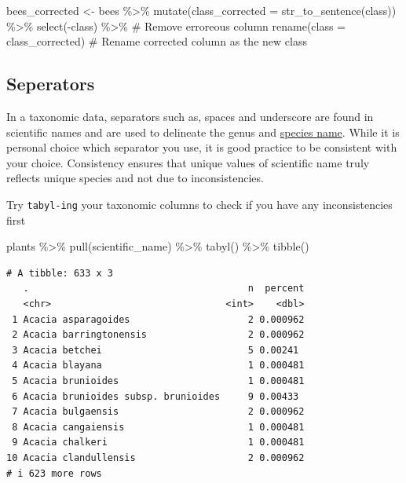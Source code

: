 \documentclass[
  letterpaper,
  DIV=11,
  numbers=noendperiod,
  oneside]{scrreprt}
\newenvironment{Shaded}{\begin{snugshade}}{\end{snugshade}}
\newcommand{\AttributeTok}[1]{\textcolor[rgb]{0.40,0.45,0.13}{#1}}
\newcommand{\CommentTok}[1]{\textcolor[rgb]{0.37,0.37,0.37}{#1}}
\newcommand{\FunctionTok}[1]{\textcolor[rgb]{0.28,0.35,0.67}{#1}}
\newcommand{\NormalTok}[1]{\textcolor[rgb]{0.00,0.23,0.31}{#1}}
\newcommand{\OtherTok}[1]{\textcolor[rgb]{0.00,0.23,0.31}{#1}}
\newcommand{\SpecialCharTok}[1]{\textcolor[rgb]{0.37,0.37,0.37}{#1}}
\begin{document}
\begin{Shaded}
\begin{Highlighting}[]
\NormalTok{bees\_corrected }\OtherTok{\textless{}{-}}\NormalTok{ bees }\SpecialCharTok{\%\textgreater{}\%} 
  \FunctionTok{mutate}\NormalTok{(}\AttributeTok{class\_corrected =} \FunctionTok{str\_to\_sentence}\NormalTok{(class)) }\SpecialCharTok{\%\textgreater{}\%} 
  \FunctionTok{select}\NormalTok{(}\SpecialCharTok{{-}}\NormalTok{class) }\SpecialCharTok{\%\textgreater{}\%} \CommentTok{\# Remove erroreous column }
  \FunctionTok{rename}\NormalTok{(}\AttributeTok{class =}\NormalTok{ class\_corrected) }\CommentTok{\# Rename corrected column as the new \textquotesingle{}class\textquotesingle{}}
\end{Highlighting}
\end{Shaded}

\hypertarget{seperators}{%
\subsection{Seperators}\label{seperators}}

In a taxonomic data, separators such as, spaces and underscore are found
in scientific names and are used to delineate the genus and
\href{https://dwc.tdwg.org/terms/\#dwc:specificEpithet}{species name}.
While it is personal choice which separator you use, it is good practice
to be consistent with your choice. Consistency ensures that unique
values of scientific name truly reflects unique species and not due to
inconsistencies.

Try \texttt{tabyl-ing} your taxonomic columns to check if you have any
inconsistencies first

\begin{Shaded}
\begin{Highlighting}[]
\NormalTok{plants }\SpecialCharTok{\%\textgreater{}\%} 
  \FunctionTok{pull}\NormalTok{(scientific\_name) }\SpecialCharTok{\%\textgreater{}\%} 
  \FunctionTok{tabyl}\NormalTok{() }\SpecialCharTok{\%\textgreater{}\%} 
  \FunctionTok{tibble}\NormalTok{()}
\end{Highlighting}
\end{Shaded}

\begin{verbatim}
# A tibble: 633 x 3
   .                                       n  percent
   <chr>                               <int>    <dbl>
 1 Acacia asparagoides                     2 0.000962
 2 Acacia barringtonensis                  2 0.000962
 3 Acacia betchei                          5 0.00241 
 4 Acacia blayana                          1 0.000481
 5 Acacia brunioides                       1 0.000481
 6 Acacia brunioides subsp. brunioides     9 0.00433 
 7 Acacia bulgaensis                       2 0.000962
 8 Acacia cangaiensis                      1 0.000481
 9 Acacia chalkeri                         1 0.000481
10 Acacia clandullensis                    2 0.000962
# i 623 more rows
\end{verbatim}
\end{document}
